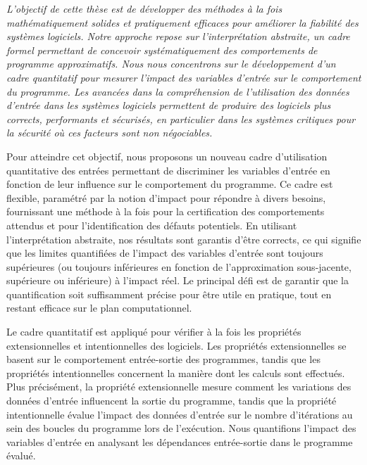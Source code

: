{\em
L'objectif de cette thèse est de développer des méthodes à la fois mathématiquement solides et pratiquement efficaces pour améliorer la fiabilité des systèmes logiciels. Notre approche repose sur l'interprétation abstraite, un cadre formel permettant de concevoir systématiquement des comportements de programme approximatifs. Nous nous concentrons sur le développement d'un cadre quantitatif pour mesurer l'impact des variables d'entrée sur le comportement du programme. Les avancées dans la compréhension de l'utilisation des données d'entrée dans les systèmes logiciels permettent de produire des logiciels plus corrects, performants et sécurisés, en particulier dans les systèmes critiques pour la sécurité où ces facteurs sont non négociables.

Pour atteindre cet objectif, nous proposons un nouveau cadre d'utilisation quantitative des entrées permettant de discriminer les variables d'entrée en fonction de leur influence sur le comportement du programme. Ce cadre est flexible, paramétré par la notion d'impact pour répondre à divers besoins, fournissant une méthode à la fois pour la certification des comportements attendus et pour l'identification des défauts potentiels. En utilisant l'interprétation abstraite, nos résultats sont garantis d'être corrects, ce qui signifie que les limites quantifiées de l'impact des variables d'entrée sont toujours supérieures (ou toujours inférieures en fonction de l'approximation sous-jacente, supérieure ou inférieure) à l'impact réel. Le principal défi est de garantir que la quantification soit suffisamment précise pour être utile en pratique, tout en restant efficace sur le plan computationnel.

Le cadre quantitatif est appliqué pour vérifier à la fois les propriétés extensionnelles et intentionnelles des logiciels. Les propriétés extensionnelles se basent sur le comportement entrée-sortie des programmes, tandis que les propriétés intentionnelles concernent la manière dont les calculs sont effectués. Plus précisément, la propriété extensionnelle mesure comment les variations des données d'entrée influencent la sortie du programme, tandis que la propriété intentionnelle évalue l'impact des données d'entrée sur le nombre d'itérations au sein des boucles du programme lors de l'exécution. Nous quantifions l'impact des variables d'entrée en analysant les dépendances entrée-sortie dans le programme évalué.

}
